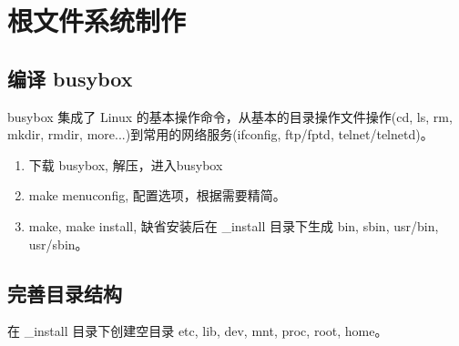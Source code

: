 \documentclass[nofonts]{ctexart}
\begin{document}
\section{根文件系统制作}
\subsection{编译 busybox}
  busybox 集成了 Linux 的基本操作命令，从基本的目录操作文件操作(cd, ls, rm,
  mkdir, rmdir, more...)到常用的网络服务(ifconfig, ftp/fptd, telnet/telnetd)。

\begin{enumerate}
  \item 下载 busybox, 解压，进入busybox
  \item make menuconfig, 配置选项，根据需要精简。
  \item make, make install, 缺省安装后在 \_install 目录下生成 bin, sbin,
    usr/bin, usr/sbin。
\end{enumerate}

\subsection{完善目录结构}
  在 \_install 目录下创建空目录 etc, lib, dev, mnt, proc, root, home。
\end{document}
